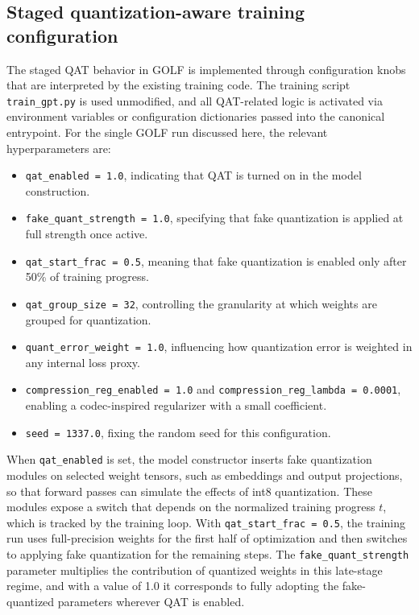 \documentclass{article}
\begin{document}
\subsection{Staged quantization-aware training configuration}

\label{sec:staged_quantization_aware_training_confi}

The staged QAT behavior in GOLF is implemented through configuration knobs that are interpreted by the existing training code. The training script \texttt{train\_gpt.py} is used unmodified, and all QAT-related logic is activated via environment variables or configuration dictionaries passed into the canonical entrypoint. For the single GOLF run discussed here, the relevant hyperparameters are:

\begin{itemize}
 \item \texttt{qat\_enabled = 1.0}, indicating that QAT is turned on in the model construction.
 \item \texttt{fake\_quant\_strength = 1.0}, specifying that fake quantization is applied at full strength once active.
 \item \texttt{qat\_start\_frac = 0.5}, meaning that fake quantization is enabled only after 50\% of training progress.
 \item \texttt{qat\_group\_size = 32}, controlling the granularity at which weights are grouped for quantization.
 \item \texttt{quant\_error\_weight = 1.0}, influencing how quantization error is weighted in any internal loss proxy.
 \item \texttt{compression\_reg\_enabled = 1.0} and \texttt{compression\_reg\_lambda = 0.0001}, enabling a codec-inspired regularizer with a small coefficient.
 \item \texttt{seed = 1337.0}, fixing the random seed for this configuration.
\end{itemize}

When \texttt{qat\_enabled} is set, the model constructor inserts fake quantization modules on selected weight tensors, such as embeddings and output projections, so that forward passes can simulate the effects of int8 quantization. These modules expose a switch that depends on the normalized training progress \(t\), which is tracked by the training loop. With \texttt{qat\_start\_frac = 0.5}, the training run uses full-precision weights for the first half of optimization and then switches to applying fake quantization for the remaining steps. The \texttt{fake\_quant\_strength} parameter multiplies the contribution of quantized weights in this late-stage regime, and with a value of 1.0 it corresponds to fully adopting the fake-quantized parameters wherever QAT is enabled.
\end{document}
